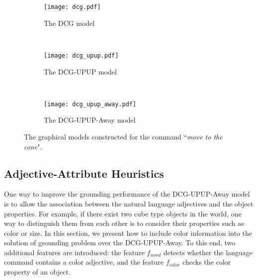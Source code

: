 \begin{figure*}
\centering
\begin{subfigure}[t]{0.235\textwidth}
\centering
\texttt{[image: dcg.pdf]}
\caption{The DCG model}
\label{fig:dcg}
\end{subfigure}
~
\begin{subfigure}[t]{0.31\textwidth}
\centering
\texttt{[image: dcg\_upup.pdf]}
\caption{The DCG-UPUP model}
\label{fig:dcg-upup}
\end{subfigure}
~
\begin{subfigure}[t]{0.4\textwidth}
\centering
\texttt{[image: dcg\_upup\_away.pdf]}
\caption{The DCG-UPUP-Away model}
\label{fig:dcg-upup-away}
\end{subfigure}
\caption{The graphical models constructed for the command ``\emph{move to the cone}".}
\end{figure*}

\subsection{Adjective-Attribute Heuristics}
One way to improve the grounding performance of the DCG-UPUP-Away model is to allow the association between the natural language adjectives and the object properties. For example, if there exist two cube type objects in the world, one way to distinguish them from each other is to consider their properties such as color or size. In this section, we present how to include color information into the solution of grounding problem over the DCG-UPUP-Away. To this end, two additional features are introduced: the feature $f_{word}$ detects whether the language command contains a color adjective, and the feature $f_{color}$ checks the color property of an object.     

